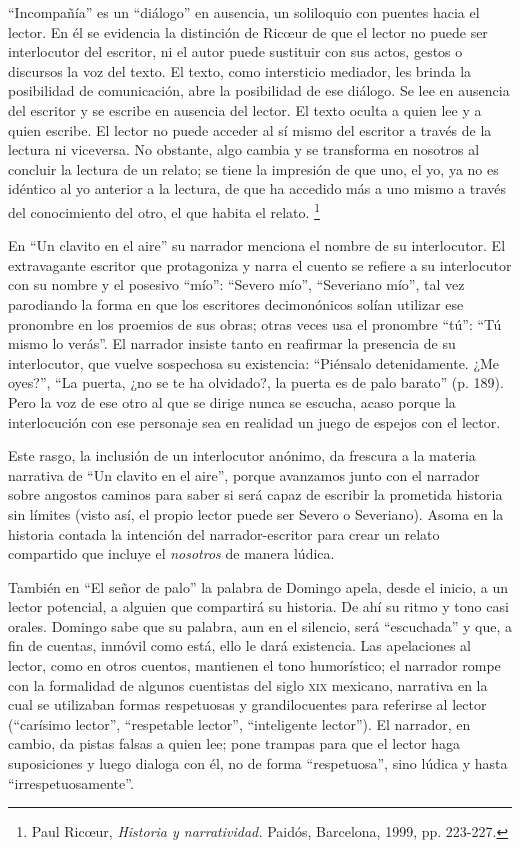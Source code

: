 \documentclass[14pt,twoside,final]{extbook} %
\let\oldfootnote\footnote
\renewcommand\footnote[1]{%
\oldfootnote{\hspace{1mm}#1}}
\begin{document}
``Incompañía'' es un ``diálogo'' en ausencia, un soliloquio con puentes hacia el lector. En él se evidencia la distinción de Ric\oe ur de que el lector no puede ser interlocutor del escritor, ni el autor puede sustituir con sus actos, gestos o discursos la voz del texto. El texto, como intersticio mediador, les brinda la posibilidad de comunicación, abre la posibilidad de ese diálogo. Se lee en ausencia del escritor y se escribe en ausencia del lector. El texto oculta a quien lee y a quien escribe. El lector no puede acceder al sí mismo del escritor a través de la lectura ni viceversa. No obstante, algo cambia y se transforma en nosotros al concluir la lectura de un relato; se tiene la impresión de que uno, el yo, ya no es idéntico al yo anterior a la lectura, de que ha accedido más a uno mismo a través del conocimiento del otro, el que habita el relato.\footnote{Paul Ric\oe ur, \emph{Historia y narratividad.} Paidós, Barcelona, 1999, pp. 223-227.}

En ``Un clavito en el aire'' su narrador menciona el nombre de su interlocutor. El extravagante escritor que protagoniza y narra el cuento se refiere a su interlocutor con su nombre y el posesivo ``mío'': ``Severo mío'', ``Severiano mío'', tal vez parodiando la forma en que los escritores decimonónicos solían utilizar ese pronombre en los proemios de sus obras; otras veces usa el pronombre ``tú'': ``Tú mismo lo verás''. El narrador insiste tanto en reafirmar la presencia de su interlocutor, que vuelve sospechosa su existencia: ``Piénsalo detenidamente. ¿Me oyes?'', ``La puerta, ¿no se te ha olvidado?, la puerta es de palo barato'' (p. 189). Pero la voz de ese otro al que se dirige nunca se escucha, acaso porque la interlocución con ese personaje sea en realidad un juego de espejos con el lector.

Este rasgo, la inclusión de un interlocutor anónimo, da frescura a la materia narrativa de ``Un clavito en el aire'', porque avanzamos junto con el narrador sobre angostos caminos para saber si será capaz de escribir la prometida historia sin límites (visto así, el propio lector puede ser Severo o Severiano). Asoma en la historia contada la intención del narrador-escritor para crear un relato compartido que incluye el \emph{nosotros} de manera lúdica.

También en ``El señor de palo'' la palabra de Domingo apela, desde el inicio, a un lector potencial, a alguien que compartirá su historia. De ahí su ritmo y tono casi orales. Domingo sabe que su palabra, aun en el silencio, será ``escuchada'' y que, a fin de cuentas, inmóvil como está, ello le dará existencia. Las apelaciones al lector, como en otros cuentos, mantienen el tono humorístico; el narrador rompe con la formalidad de algunos cuentistas del siglo \textsc{xix} mexicano, narrativa en la cual se utilizaban formas respetuosas y grandilocuentes para referirse al lector (``carísimo lector'', ``respetable lector'', ``inteligente lector''). El narrador, en cambio, da pistas falsas a quien lee; pone trampas para que el lector haga suposiciones y luego dialoga con él, no de forma ``respetuosa'', sino lúdica y hasta ``irrespetuosamente''.
\end{document}
